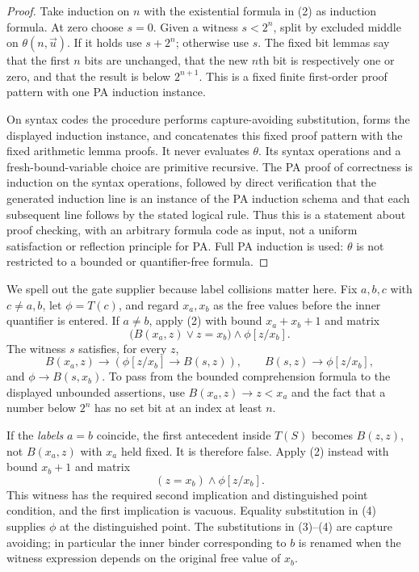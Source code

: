 \begin{proof}
Take induction on $n$ with the existential formula in (2) as induction
formula. At zero choose $s=0$. Given a witness $s<2^n$, split by
excluded middle on $\theta(n,\vec u)$. If it holds use $s+2^n$;
otherwise use $s$. The fixed bit lemmas say that the first $n$ bits
are unchanged, that the new $n$th bit is respectively one or zero,
and that the result is below $2^{n+1}$. This is a fixed finite
first-order proof pattern with one PA induction instance.

On syntax codes the procedure performs capture-avoiding substitution,
forms the displayed induction instance, and concatenates this fixed
proof pattern with the fixed arithmetic lemma proofs. It never
evaluates $\theta$. Its syntax operations and a fresh-bound-variable
choice are primitive recursive. The PA proof of correctness is
induction on the syntax operations, followed by direct verification
that the generated induction line is an instance of the PA induction
schema and that each subsequent line follows by the stated logical
rule. Thus this is a statement about proof checking, with an arbitrary
formula code as input, not a uniform satisfaction or reflection
principle for PA. Full PA induction is used: $\theta$ is not restricted
to a bounded or quantifier-free formula.
\end{proof}

We spell out the gate supplier because label collisions matter here.
Fix $a,b,c$ with $c\ne a,b$, let $\phi=T(c)$, and regard $x_a,x_b$
as the free values before the inner quantifier is entered.
If $a\ne b$, apply (2) with bound $x_a+x_b+1$ and matrix
\[
 \bigl(B(x_a,z)\vee z=x_b\bigr)\wedge\phi[z/x_b].
                                                        \tag{3}
\]
The witness $s$ satisfies, for every $z$,
\[
 B(x_a,z)\to(\phi[z/x_b]\to B(s,z)),\qquad
 B(s,z)\to\phi[z/x_b],
\]
and $\phi\to B(s,x_b)$. To pass from the bounded comprehension
formula to the displayed unbounded assertions, use
$B(x_a,z)\to z<x_a$ and the fact that a number below $2^n$ has no
set bit at an index at least $n$.

If the \emph{labels} $a=b$ coincide, the first antecedent inside
$T(S)$ becomes $B(z,z)$, not $B(x_a,z)$ with $x_a$ held fixed.
It is therefore false. Apply (2) instead with bound $x_b+1$ and
matrix
\[
 (z=x_b)\wedge\phi[z/x_b].                              \tag{4}
\]
This witness has the required second implication and distinguished
point condition, and the first implication is vacuous. Equality
substitution in (4) supplies $\phi$ at the distinguished point.
The substitutions in (3)--(4) are capture avoiding; in particular
the inner binder corresponding to $b$ is renamed when the witness
expression depends on the original free value of $x_b$.

